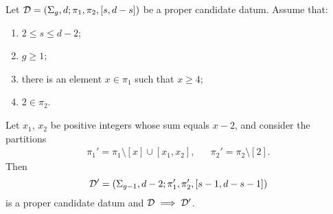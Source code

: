 \documentclass{article}
\begin{document}
\begin{combinatorialmove}\label{move:4-2}
Let $\mathcal{D}=\left(\Sigma_g,d;\pi_1,\pi_2,[s,d-s]\right)$ be a proper candidate datum. Assume that:
\begin{enumerate}
\item $2\le s\le d-2$;
\item $g\ge 1$;
\item there is an element $x\in\pi_1$ such that $x\ge 4$;
\item $2\in\pi_2$.
\end{enumerate}
Let $x_1$, $x_2$ be positive integers whose sum equals $x-2$, and consider the partitions
\begin{align*}
\pi_1'=\pi_1\setminus[x]\cup[x_1,x_2],&&\pi_2'=\pi_2\setminus[2].
\end{align*}
Then
\[
\mathcal{D'}=\left(\Sigma_{g-1},d-2;\pi_1',\pi_2',[s-1,d-s-1]\right)
\]
is a proper candidate datum and $\mathcal{D}\implies\mathcal{D}'$.
\end{combinatorialmove}
\end{document}
